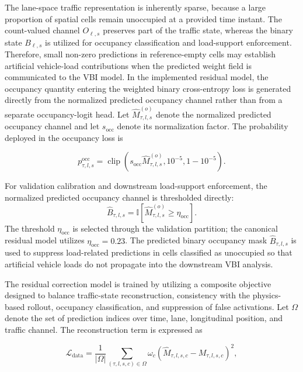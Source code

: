 \documentclass[journal]{IEEEtran}
\begin{document}
The lane-space traffic representation is inherently sparse, because a large proportion of spatial cells remain unoccupied at a provided time instant. The count-valued channel $O_{\ell,s}$ preserves part of the traffic state, whereas the binary state $B_{\ell,s}$ is utilized for occupancy classification and load-support enforcement. Therefore, small non-zero predictions in reference-empty cells may establish artificial vehicle-load contributions when the predicted weight field is communicated to the VBI model. In the implemented residual model, the occupancy quantity entering the weighted binary cross-entropy loss is generated directly from the normalized predicted occupancy channel rather than from a separate occupancy-logit head. Let $\widehat{M}_{\tau,l,s}^{(o)}$ denote the normalized predicted occupancy channel and let $s_{\mathrm{occ}}$ denote its normalization factor. The probability deployed in the occupancy loss is

\begin{equation}
p_{\tau,l,s}^{\mathrm{occ}}
=
\operatorname{clip}
\left(
s_{\mathrm{occ}}\widehat{M}_{\tau,l,s}^{(o)},
10^{-5},
1-10^{-5}
\right).
\end{equation}



For validation calibration and downstream load-support enforcement, the normalized predicted occupancy channel is thresholded directly:
\begin{equation}
\widehat{B}_{\tau,l,s}
=
\mathbb{I}\left[
\widehat{M}_{\tau,l,s}^{(o)}
\geq \eta_{\mathrm{occ}}
\right].
\label{eq:predicted_binary_occupancy}
\end{equation}
The threshold $\eta_{\mathrm{occ}}$ is selected through the validation partition; the canonical residual model utilizes $\eta_{\mathrm{occ}}=0.23$. The predicted binary occupancy mask \(\hat B_{\tau,l,s}\) is used to suppress load-related predictions in cells classified as unoccupied so that artificial vehicle loads do not propagate into the downstream VBI analysis.

The residual correction model is trained by utilizing a composite objective designed to balance traffic-state reconstruction, consistency with the physics-based rollout, occupancy classification, and suppression of false activations. Let $\Omega$ denote the set of prediction indices over time, lane, longitudinal position, and traffic channel. The reconstruction term is expressed as

\begin{equation}
\mathcal{L}_{\mathrm{data}}
=
\frac{1}{|\Omega|}
\sum_{(\tau,l,s,c)\in\Omega}
\omega_c
\left(
\widehat{M}_{\tau,l,s,c}
-
M_{\tau,l,s,c}
\right)^2,
\end{equation}
\end{document}
